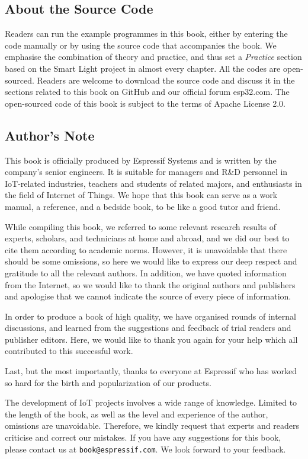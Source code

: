 \documentclass[a4paper,12pt]{book}
\begin{document}
\subsection*{About the Source Code}
Readers can run the example programmes in this book, either by entering the code manually or by using the source code that accompanies the book. We emphasise the combination of theory and practice, and thus set a \textit{Practice} section based on the Smart Light project in almost every chapter. All the codes are open-sourced. Readers are welcome to download the source code and discuss it in the sections related to this book on GitHub and our official forum esp32.com. The open-sourced code of this book is subject to the terms of Apache License 2.0.

\subsection*{Author’s Note}
This book is officially produced by Espressif Systems and is written by the company’s senior engineers. It is suitable for managers and R\&D personnel in IoT-related industries, teachers and students of related majors, and enthusiasts in the field of Internet of Things. We hope that this book can serve as a work manual, a reference, and a bedside book, to be like a good tutor and friend.

While compiling this book, we referred to some relevant research results of experts, scholars, and technicians at home and abroad, and we did our best to cite them according to academic norms. However, it is unavoidable that there should be some omissions, so here we would like to express our deep respect and gratitude to all the relevant authors. In addition, we have quoted information from the Internet, so we would like to thank the original authors and publishers and apologise that we cannot indicate the source of every piece of information.

In order to produce a book of high quality, we have organised rounds of internal discussions, and learned from the suggestions and feedback of trial readers and publisher editors. Here, we would like to thank you again for your help which all contributed to this successful work.

Last, but the most importantly, thanks to everyone at Espressif who has worked so hard for the birth and popularization of our products.

The development of IoT projects involves a wide range of knowledge. Limited to the length of the book, as well as the level and experience of the author, omissions are unavoidable. Therefore, we kindly request that experts and readers criticise and correct our mistakes. If you have any suggestions for this book, please contact us at \texttt{book@espressif.com}. We look forward to your feedback.
\end{document}

